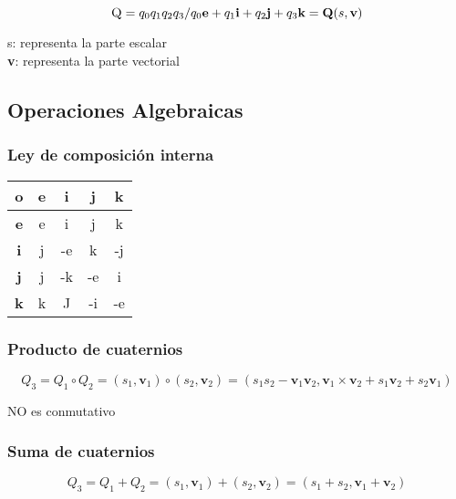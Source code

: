 \documentclass[letterpaper, openright, 12pt, spanish]{report}
\begin{document}
\begin{displaymath} 
\textsc{Q}=
{q_0 q_1 q_2 q_3/q_0\textbf{e}+q_1\textbf{i}+q_2\textbf{j}+q_3\textbf{k}}=\textbf{Q}(s, \textbf{v})
\end{displaymath}

s: representa la parte escalar\\

\textbf{v}: representa la parte vectorial

\newpage

\subsection{Operaciones Algebraicas}

\subsubsection{Ley de composici\'on interna}

\begin {center}
\begin{tabular}{|c|c|c|c|c|}
\hline
	o & \textbf{e} & \textbf{i} & \textbf{j} & \textbf{k}\\
\hline
	\textbf{e} & e & i & j & k\\
\hline
	\textbf{i} & j & -e & k & -j\\
\hline
	\textbf{j} & j & -k & -e & i\\
\hline
	\textbf{k} & k & J & -i & -e\\
\hline 
\end{tabular}
\end {center}

\subsubsection{Producto de cuaternios}

\begin{displaymath}
Q_3=Q_1\circ Q_2=(s_1, \textbf{v}_1)\circ (s_2,\textbf{v}_2)=(s_1 s_2-\textbf{v}_1 \textbf{v}_2, \textbf{v}_1 \times\textbf{v}_2+s_1\textbf{v}_2+s_2\textbf{v}_1)
\end{displaymath}

NO es conmutativo

\subsubsection{Suma de cuaternios}

\begin{displaymath}
Q_3=Q_1+Q_2=(s_1,\textbf{v}_1)+(s_2, \textbf{v}_2)=(s_1+s_2, \textbf{v}_1+\textbf{v}_2)
\end{displaymath}
\end{document}
